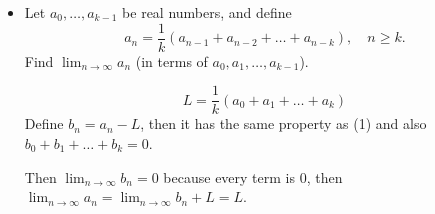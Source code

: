 \documentclass[12pt]{article}
\begin{document}
\begin{itemize}
\[
a_{n+1} - (2 + \sqrt{3}) a_n
= (2 - \sqrt{3})(a_n - (2 + \sqrt{3})a_{n-1})
\]
\[
a_{n+1} - (2 + \sqrt{3}) a_n
= (2 - \sqrt{3})^n(a_1 - (2 + \sqrt{3})a_0)=\sqrt{3}(2 - \sqrt{3})^n
\]
\[
a_{n+1}+\frac{(2-\sqrt{3})^{n+1}}{2}=(2+\sqrt{3})\left(a_{n}+\frac{(2-\sqrt{3})^n}{2}\right)
\]
\[
a_{n}+\frac{(2-\sqrt{3})^n}{2}=(2+\sqrt{3})^n\left(a_0+\frac{1}{2}\right)=\frac{3}{2}(2+\sqrt{3})^n
\]
\[
a_{n}=\frac{3}{2}(2+\sqrt{3})^n-\frac{1}{2}(2-\sqrt{3})^n
\]


\item[20 a)] Let $a_0,\dots, a_{k-1}$ be real numbers, and define
\begin{equation}
a_n = \frac{1}{k}(a_{n-1} + a_{n-2} +\dots+ a_{n-k}), \quad n \geq k.
\end{equation}
Find $\lim_{n\rightarrow \infty} a_n$ (in terms of $a_0, a_1,\dots,a_{k-1}$).

\[
L= \frac{1}{k}(a_{0} + a_{1} +\dots+ a_{k})
\]
Define $b_n=a_n-L$, then it has the same property as (1) and also $b_{0} + b_{1} +\dots+ b_{k}=0$. 

Then $\lim_{n\rightarrow \infty} b_n=0$ because every term is 0, then $\lim_{n\rightarrow \infty} a_n=\lim_{n\rightarrow \infty} b_n+L=L$.

\end{itemize}
\end{document}
